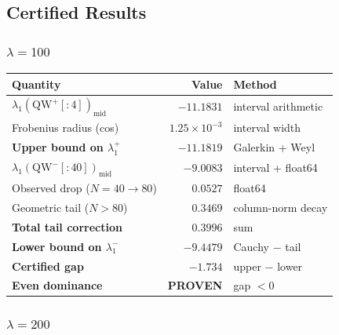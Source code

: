 \documentclass[12pt,a4paper]{article}
\theoremstyle{definition}
\theoremstyle{remark}
\begin{document}
\subsection{Certified Results}

\subsubsection{$\lambda = 100$}

\begin{center}
\renewcommand{\arraystretch}{1.2}
\begin{tabular}{lrl}
\toprule
\textbf{Quantity} & \textbf{Value} & \textbf{Method} \\
\midrule
$\lambda_1(\mathrm{QW}^+[{:}4])_{\mathrm{mid}}$ & $-11.1831$ & interval arithmetic \\
Frobenius radius (cos) & $1.25 \times 10^{-3}$ & interval width \\
\textbf{Upper bound on $\lambda_1^+$} & $\mathbf{-11.1819}$ & Galerkin + Weyl \\
\midrule
$\lambda_1(\mathrm{QW}^-[{:}40])_{\mathrm{mid}}$ & $-9.0083$ & interval + float64 \\
Observed drop ($N{=}40 \to 80$) & $0.0527$ & float64 \\
Geometric tail ($N{>}80$) & $0.3469$ & column-norm decay \\
\textbf{Total tail correction} & $\mathbf{0.3996}$ & sum \\
\textbf{Lower bound on $\lambda_1^-$} & $\mathbf{-9.4479}$ & Cauchy $-$ tail \\
\midrule
\textbf{Certified gap} & $\mathbf{-1.734}$ & upper $-$ lower \\
\textbf{Even dominance} & \textbf{PROVEN} & gap $< 0$ \\
\bottomrule
\end{tabular}
\end{center}

\subsubsection{$\lambda = 200$}
\end{document}
